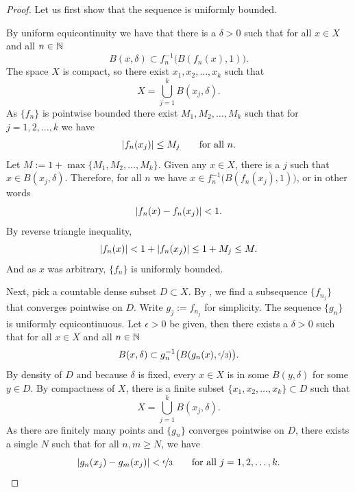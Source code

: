 \begin{proof}
Let us first show that the sequence is uniformly bounded.

By uniform equicontinuity we have that
there is a $\delta > 0$
such that
for all $x \in X$ and all $n \in {\mathbb{N}}$
\begin{equation*}
B(x,\delta) \subset f_n^{-1}\bigl(B(f_n(x),1)\bigr) .
\end{equation*}
The space $X$ is compact, so there exist $x_1,x_2,\ldots,x_k$
such that
\begin{equation*}
X = \bigcup_{j=1}^k B(x_j,\delta) .
\end{equation*}
As $\{ f_n \}$ is pointwise bounded there exist $M_1,M_2,\ldots,M_k$
such that for $j=1,2,\ldots,k$ we have
\begin{equation*}
\lvert {f_n(x_j)} \rvert \leq M_j \qquad \text{for all } n.
\end{equation*}
Let $M := 1+ \max \{ M_1,M_2,\ldots,M_k \}$.  Given any
$x \in X$, there is a $j$ such that $x \in B(x_j,\delta)$.  Therefore,
for all $n$ we have
$x \in f_n^{-1}\bigl(B(f_n(x_j),1)\bigr)$, or in other words
\begin{equation*}
\lvert {f_n(x)-f_n(x_j)} \rvert < 1 .
\end{equation*}
By reverse triangle inequality,
\begin{equation*}
\lvert {f_n(x)} \rvert < 1+ \lvert {f_n(x_j)} \rvert \leq 1+M_j \leq M .
\end{equation*}
And as $x$ was arbitrary, $\{f_n\}$ is uniformly bounded.


Next, pick a countable dense subset $D \subset X$.
By , we find
a subsequence $\{ f_{n_j} \}$ that converges pointwise on $D$.
Write $g_j := f_{n_j}$ for simplicity.
The sequence $\{ g_n \}$ is 
uniformly equicontinuous.
Let $\epsilon > 0$ be given, then there exists a $\delta > 0$
such that for all $x \in X$ and all $n \in {\mathbb{N}}$
\begin{equation*}
B(x,\delta) \subset g_n^{-1}\bigl(B(g_n(x),\nicefrac{\epsilon}{3})\bigr).
\end{equation*}
By density of $D$ and because $\delta$ is fixed, every $x \in X$ is in some $B(y,\delta)$
for some $y \in D$.  By compactness of $X$,
there is a finite subset $\{ x_1,x_2,\ldots,x_k \} \subset D$
such that
\begin{equation*}
X = \bigcup_{j=1}^k B(x_j,\delta) .
\end{equation*}
As there are finitely many points and $\{ g_n \}$
converges pointwise on $D$, there exists a single $N$ such that for 
all $n,m \geq N$, we have
\begin{equation*}
\lvert {g_n(x_j)-g_m(x_j)} \rvert < \nicefrac{\epsilon}{3}
 \qquad \text{for all } j=1,2,\ldots,k.
\end{equation*}


\end{proof}
